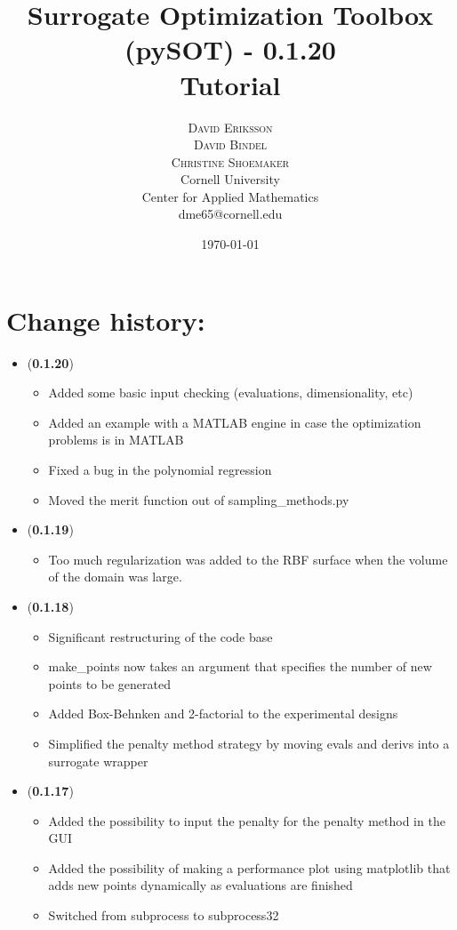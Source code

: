 \documentclass[]{article}
\title{\vspace{-15mm}%
	\fontsize{18pt}{10pt}\selectfont
	\textbf{Surrogate Optimization Toolbox (pySOT) - 0.1.20 \\ Tutorial}
	}
\author{%
	\Large\textsc{David Eriksson} \\[2mm]
	\Large\textsc{David Bindel} \\[2mm]
	\Large\textsc{Christine Shoemaker} \\[2mm]
		\normalsize	Cornell University \\
	\normalsize Center for Applied Mathematics \\
	\normalsize	dme65@cornell.edu \\ 
	}
\date{\today}
\begin{document}
\fontsize{12}{14}\rm

\maketitle
\thispagestyle{fancy}
\tableofcontents
\newpage

\section{Change history:}
\begin{itemize}

	\item (\textbf{0.1.20})
	\begin{itemize}
		\item Added some basic input checking (evaluations, dimensionality, etc)
		\item Added an example with a MATLAB engine in case the optimization problems is in MATLAB
		\item Fixed a bug in the polynomial regression
		\item Moved the merit function out of sampling\_methods.py
	\end{itemize}

	\item (\textbf{0.1.19})
	\begin{itemize}
		\item 	Too much regularization was added to the RBF surface when the volume of the domain was large.
	\end{itemize}

	\item (\textbf{0.1.18})
	\begin{itemize}
		\item Significant restructuring of the code base
		\item make\_points now takes an argument that specifies the number of new points to be generated
		\item Added Box-Behnken and 2-factorial to the experimental designs
		\item Simplified the penalty method strategy by moving evals and derivs into a surrogate wrapper
	\end{itemize}

	\item (\textbf{0.1.17})
	\begin{itemize}
		\item Added the possibility to input the penalty for the penalty method in the GUI
		\item Added the possibility of making a performance plot using matplotlib that adds new points 
		dynamically as evaluations are finished
		\item Switched from subprocess to subprocess32
	\end{itemize}


\end{itemize}
\end{document}
